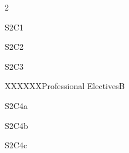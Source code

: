 \documentclass[a4paper]{syllabus}
\begin{document}
	\begin{semester}{2}
		\begin{definecourse}{S2C1}
		\end{definecourse}
		\begin{definecourse}{S2C2}
		\end{definecourse}
		\begin{definecourse}{S2C3}
		\end{definecourse}
		
		\begin{electivegroup}{XXXXXX}{Professional Electives}{B}
		\begin{definecourse}{S2C4a}
		\end{definecourse}
		
		\begin{definecourse}{S2C4b}
		\end{definecourse}
		
		\begin{definecourse}{S2C4c}
		\end{definecourse}
		
		\end{electivegroup}
	 	
	 	
		

\end{semester}
\end{document}
